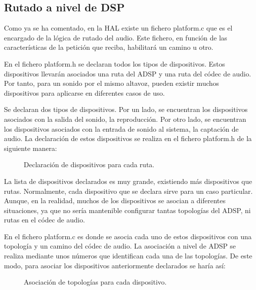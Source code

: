 \subsection{Rutado a nivel de DSP}
Como ya se ha comentado, en la \gls{HAL} existe un fichero platform.c que es el encargado de la lógica de rutado del audio. Este fichero, en función de las características de la petición que reciba, habilitará un camino u otro.

En el fichero platform.h se declaran todos los tipos de dispositivos. Estos dispositivos llevarán asociados una ruta del \gls{ADSP} y una ruta del códec de audio. Por tanto, para un sonido por el mismo altavoz, pueden existir muchos dispositivos para aplicarse en diferentes casos de uso.

Se declaran dos tipos de dispositivos. Por un lado, se encuentran los dispositivos asociados con la salida del sonido, la reproducción. Por otro lado, se encuentran los dispositivos asociados con la entrada de sonido al sistema, la captación de audio. La declaración de estos dispositivos se realiza en el fichero platform.h de la siguiente manera:

\begin{figure}[H]
	\centering
	\caption{Declaración de dispositivos para cada ruta.} \label{fig:declaracion_snd}
\end{figure} 

La lista de dispositivos declarados es muy grande, existiendo más dispositivos que rutas. Normalmente, cada dispositivo que se declara sirve para un caso particular. Aunque, en la realidad, muchos de los dispositivos se asocian a diferentes situaciones, ya que no sería mantenible configurar tantas topologías del \gls{ADSP}, ni rutas en el códec de audio.

En el fichero platform.c es donde se asocia cada uno de estos dispositivos con una topología y un camino del códec de audio. La asociación a nivel de \gls{ADSP} se realiza mediante unos números que identifican cada una de las topologías. De este modo, para asociar los dispositivos anteriormente declarados se haría así:

\begin{figure}[H]
	\centering
	\caption{Asociación de topologías para cada dispositivo.} \label{fig:asociacion_acdb_id}
\end{figure} 

